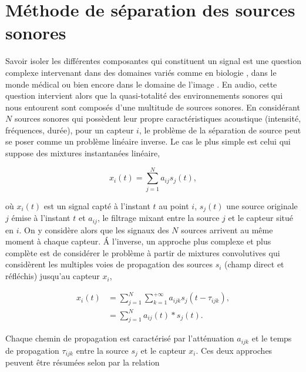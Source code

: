 %
%
%
%
%

\chapter{Méthode de séparation des sources sonores}
\label{chap:methode_separation_source}


Savoir isoler les différentes composantes qui constituent un signal est une question complexe intervenant dans des domaines variés comme en biologie \cite{chiappetta2004blind}, dans le monde médical \cite{jung2000removing} ou bien encore dans le domaine de l'image \cite{nuzillard2000blind}. En audio, cette question intervient alors que la quasi-totalité des environnements sonores qui nous entourent sont composés d'une multitude de sources sonores. En considérant $N$ sources sonores qui possèdent leur propre caractéristiques acoustique (intensité, fréquences, durée), pour un capteur $i$, le problème de la séparation de source peut se poser comme un problème linéaire inverse. Le cas le plus simple est celui qui suppose des mixtures instantanées linéaire, 

\begin{equation}
x_i(t) = \sum_{j = 1}^{N} a_{ij}s_j(t),
\end{equation}

où $x_i(t)$ est un signal capté à l'instant $t$ au point $i$, $s_j(t)$ une source originale $j$ émise à l'instant $t$ et $a_{ij}$, le filtrage mixant entre la source $j$ et le capteur situé en $i$. On y considère alors que les signaux des $N$ sources arrivent au même moment à chaque capteur. \'A l'inverse, un approche plus complexe et plus complète est de considérer le problème à partir de mixtures convolutives qui considèrent les multiples voies de propagation des sources $s_i$ (champ direct et réfléchis) jusqu'au capteur $x_i$,  

\begin{subequations}
\begin{align}
x_i(t) &= \sum_{j = 1}^{N} \sum_{k = 1}^{+\infty} a_{ijk} s_j(t-\tau_{ijk}),\\
 &= \sum_{j = 1}^{N} a_{ij}(t) \ast s_j(t).\label{eq:BSS_convol}
\end{align}
\end{subequations}

Chaque chemin de propagation est caractérisé par l'atténuation $a_{ijk}$ et le temps de propagation $\tau_{ijk}$ entre la source $s_j$ et le capteur $x_i$. Ces deux approches peuvent être résumées selon \cite{cardoso_blind_1998} par la relation  

